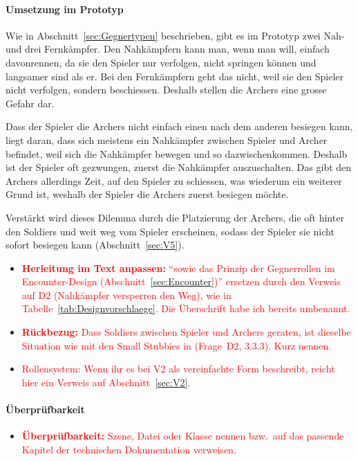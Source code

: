 \documentclass[../Main.tex]{subfiles}
\begin{document}
\paragraph{Umsetzung im Prototyp}
Wie in Abschnitt~\ref{sec:Gegnertypen} beschrieben, gibt es im Prototyp zwei Nah- und drei Fernkämpfer. Den Nahkämpfern kann man, wenn man will, einfach davonrennen, da sie den Spieler nur verfolgen, nicht springen können und langsamer sind als er. Bei den Fernkämpfern geht das nicht, weil sie den Spieler nicht verfolgen, sondern beschiessen. Deshalb stellen die Archers eine grosse Gefahr dar.

Dass der Spieler die Archers nicht einfach einen nach dem anderen besiegen kann, liegt daran, dass sich meistens ein Nahkämpfer zwischen Spieler und Archer befindet, weil sich die Nahkämpfer bewegen und so dazwischenkommen. Deshalb ist der Spieler oft gezwungen, zuerst die Nahkämpfer auszuschalten. Das gibt den Archers allerdings Zeit, auf den Spieler zu schiessen, was wiederum ein weiterer Grund ist, weshalb der Spieler die Archers zuerst besiegen möchte.

Verstärkt wird dieses Dilemma durch die Platzierung der Archers, die oft hinter den Soldiers und weit weg vom Spieler erscheinen, sodass der Spieler sie nicht sofort besiegen kann (Abschnitt~\ref{sec:V5}).

\begin{itemize}[leftmargin=1.5cm]
    \item \textcolor{red}{\textbf{Herleitung im Text anpassen:} \enquote{sowie das Prinzip der Gegnerrollen im Encounter-Design (Abschnitt~\ref{sec:Encounter})} ersetzen durch den Verweis auf  D2 (Nahkämpfer versperren den Weg), wie in Tabelle~\ref{tab:Designvorschlaege}. Die Überschrift habe ich bereits umbenannt.}
    \item \textcolor{red}{\textbf{Rückbezug:} Dass Soldiers zwischen Spieler und Archers geraten, ist dieselbe Situation wie mit den Small Stubbies in  (Frage~D2, 3.3.3). Kurz nennen.}
    \item \textcolor{red}{Rollensystem: Wenn ihr es bei V2 als vereinfachte Form beschreibt, reicht hier ein Verweis auf Abschnitt~\ref{sec:V2}.}
\end{itemize}

\paragraph{Überprüfbarkeit}
\begin{itemize}[leftmargin=1.5cm]
    \item \textcolor{red}{\textbf{Überprüfbarkeit:} Szene, Datei oder Klasse nennen bzw.\ auf das passende Kapitel der technischen Dokumentation verweisen.}
\end{itemize}
\end{document}
